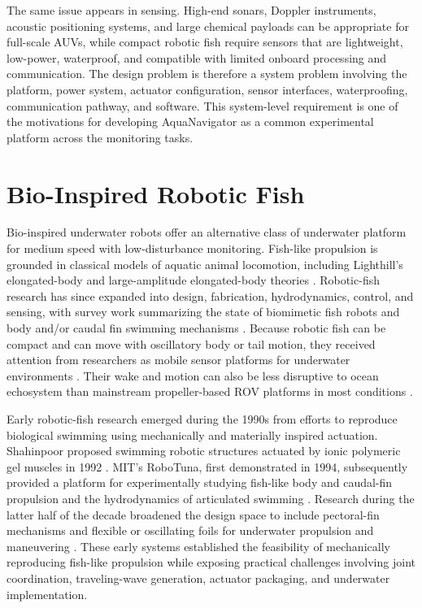 \documentclass{uhcoethesis}
\begin{document}
The same issue appears in sensing. High-end sonars, Doppler instruments, acoustic positioning systems, and large chemical payloads can be appropriate for full-scale AUVs, while compact robotic fish require sensors that are lightweight, low-power, waterproof, and compatible with limited onboard processing and communication. The design problem is therefore a system problem involving the platform, power system, actuator configuration, sensor interfaces, waterproofing, communication pathway, and software. This system-level requirement is one of the motivations for developing AquaNavigator as a common experimental platform across the monitoring tasks.

\section{Bio-Inspired Robotic Fish}
Bio-inspired underwater robots offer an alternative class of underwater platform for medium speed with low-disturbance monitoring. Fish-like propulsion is grounded in classical models of aquatic animal locomotion, including Lighthill's elongated-body and large-amplitude elongated-body theories \cite{Lighthill1969,Lighthill1971}. Robotic-fish research has since expanded into design, fabrication, hydrodynamics, control, and sensing, with survey work summarizing the state of biomimetic fish robots and body and/or caudal fin swimming mechanisms \cite{Yu2017,Duraisamy2019,Xie2021}. Because robotic fish can be compact and can move with oscillatory body or tail motion, they received attention from researchers as mobile sensor platforms for underwater environments \cite{Tan2011}. Their wake and motion can also be less disruptive to ocean echosystem than mainstream propeller-based ROV platforms in most conditions \cite{Marras2012,Polverino2013}.

Early robotic-fish research emerged during the 1990s from efforts to reproduce biological swimming using mechanically and materially inspired actuation. Shahinpoor proposed swimming robotic structures actuated by ionic polymeric gel muscles in 1992 \cite{Shahinpoor1992}. MIT's RoboTuna, first demonstrated in 1994, subsequently provided a platform for experimentally studying fish-like body and caudal-fin propulsion and the hydrodynamics of articulated swimming \cite{Thomson1994,Tolkoff1999}. Research during the latter half of the decade broadened the design space to include pectoral-fin mechanisms and flexible or oscillating foils for underwater propulsion and maneuvering \cite{Imaizumi1995,Kato1996}. These early systems established the feasibility of mechanically reproducing fish-like propulsion while exposing practical challenges involving joint coordination, traveling-wave generation, actuator packaging, and underwater implementation.
\end{document}
